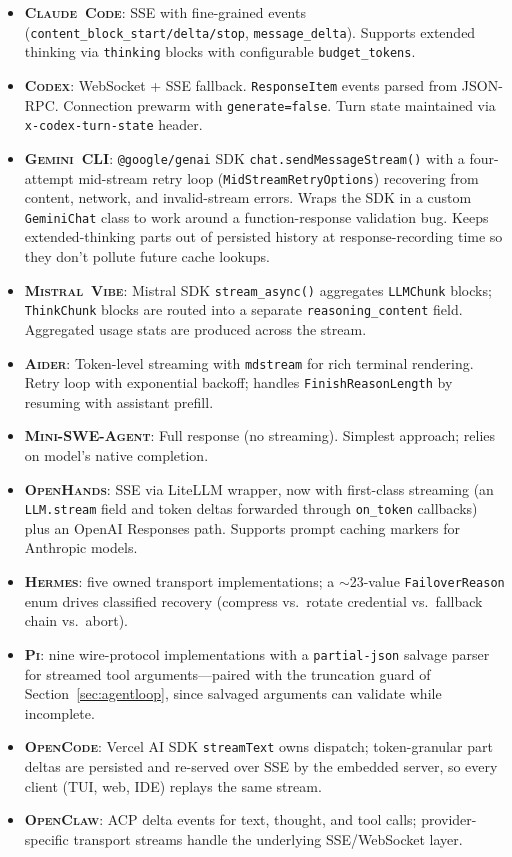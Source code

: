 \documentclass[11pt,a4paper]{article}
\newcommand{\clcode}{\textsc{Claude~Code}\xspace}
\newcommand{\cdx}{\textsc{Codex}\xspace}
\newcommand{\oh}{\textsc{OpenHands}\xspace}
\newcommand{\adr}{\textsc{Aider}\xspace}
\newcommand{\mswe}{\textsc{Mini-SWE-Agent}\xspace}
\newcommand{\ocl}{\textsc{OpenClaw}\xspace}
\newcommand{\vibe}{\textsc{Mistral~Vibe}\xspace}
\newcommand{\gemini}{\textsc{Gemini~CLI}\xspace}
\newcommand{\hrm}{\textsc{Hermes}\xspace}
\newcommand{\pib}{\textsc{Pi}\xspace}
\newcommand{\ocd}{\textsc{OpenCode}\xspace}
\begin{document}
\begin{itemize}[itemsep=1pt]
  \item \textbf{\clcode{}}: SSE with fine-grained events (\texttt{content\_block\_start/delta/stop}, \texttt{message\_delta}). Supports extended thinking via \texttt{thinking} blocks with configurable \texttt{budget\_tokens}.
  \item \textbf{\cdx{}}: WebSocket + SSE fallback. \texttt{ResponseItem} events parsed from JSON-RPC. Connection prewarm with \texttt{generate=false}. Turn state maintained via \texttt{x-codex-turn-state} header.
  \item \textbf{\gemini{}}: \texttt{@google/genai} SDK \texttt{chat.sendMessageStream()} with a four-attempt mid-stream retry loop (\texttt{MidStream\-RetryOptions}) recovering from content, network, and invalid-stream errors. Wraps the SDK in a custom \texttt{GeminiChat} class to work around a function-response validation bug. Keeps extended-thinking parts out of persisted history at response-recording time so they don't pollute future cache lookups.
  \item \textbf{\vibe{}}: Mistral SDK \texttt{stream\_async()} aggregates \texttt{LLMChunk} blocks; \texttt{ThinkChunk} blocks are routed into a separate \texttt{reasoning\_content} field. Aggregated usage stats are produced across the stream.
  \item \textbf{\adr{}}: Token-level streaming with \texttt{mdstream} for rich terminal rendering. Retry loop with exponential backoff; handles \texttt{FinishReasonLength} by resuming with assistant prefill.
  \item \textbf{\mswe{}}: Full response (no streaming). Simplest approach; relies on model's native completion.
  \item \textbf{\oh{}}: SSE via LiteLLM wrapper, now with first-class streaming (an \texttt{LLM.stream} field and token deltas forwarded through \texttt{on\_token} callbacks) plus an OpenAI Responses path. Supports prompt caching markers for Anthropic models.
  \item \textbf{\hrm{}}: five owned transport implementations; a $\sim$23-value \texttt{FailoverReason} enum drives classified recovery (compress vs.\ rotate credential vs.\ fallback chain vs.\ abort).
  \item \textbf{\pib{}}: nine wire-protocol implementations with a \texttt{partial-json} salvage parser for streamed tool arguments---paired with the truncation guard of Section~\ref{sec:agentloop}, since salvaged arguments can validate while incomplete.
  \item \textbf{\ocd{}}: Vercel AI SDK \texttt{streamText} owns dispatch; token-granular part deltas are persisted and re-served over SSE by the embedded server, so every client (TUI, web, IDE) replays the same stream.
  \item \textbf{\ocl{}}: ACP delta events for text, thought, and tool calls; provider-specific transport streams handle the underlying SSE/WebSocket layer.
\end{itemize}
\end{document}
